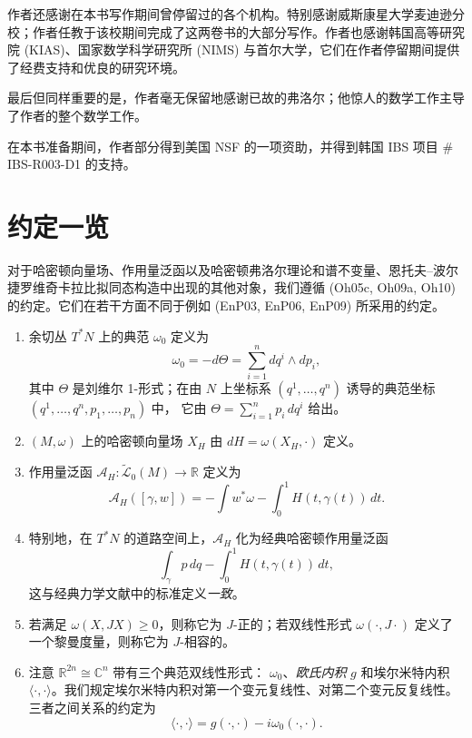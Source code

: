 作者还感谢在本书写作期间曾停留过的各个机构。特别感谢威斯康星大学麦迪逊分校；作者任教于该校期间完成了这两卷书的大部分写作。作者也感谢韩国高等研究院 (KIAS)、国家数学科学研究所 (NIMS) 与首尔大学，它们在作者停留期间提供了经费支持和优良的研究环境。

最后但同样重要的是，作者毫无保留地感谢已故的弗洛尔；他惊人的数学工作主导了作者的整个数学工作。

在本书准备期间，作者部分得到美国 NSF 的一项资助，并得到韩国 IBS 项目 \# IBS-R003-D1 的支持。

\section*{约定一览}

对于哈密顿向量场、作用量泛函以及哈密顿弗洛尔理论和谱不变量、恩托夫--波尔捷罗维奇卡拉比拟同态构造中出现的其他对象，我们遵循 (Oh05c, Oh09a, Oh10) 的约定。它们在若干方面不同于例如 (EnP03, EnP06, EnP09) 所采用的约定。

\begin{enumerate}[label=(\arabic*)]
  \item 余切丛 $T^*N$ 上的典范\termSymplecticForm{} $\omega_0$ 定义为
  \[
    \omega_0=-d\Theta=\sum_{i=1}^n dq^i\wedge dp_i,
  \]
  其中 $\Theta$ 是刘维尔 1-形式；在由 $N$ 上坐标系
  $(q^1,\ldots,q^n)$ 诱导的典范坐标
  $(q^1,\ldots,q^n,\allowbreak p_1,\ldots,p_n)$ 中，
  它由 $\Theta=\sum_{i=1}^n p_i\,dq^i$ 给出。

  \item \termSymplecticManifold{} $(M,\omega)$ 上的哈密顿向量场 $X_H$ 由 $dH=\omega(X_H,\cdot)$ 定义。

  \item 作用量泛函 $\mathcal A_H:\widetilde{\mathcal L}_0(M)\to\mathbb R$ 定义为
  \[
    \mathcal A_H([\gamma,w])=-\int w^*\omega-\int_0^1 H(t,\gamma(t))\,dt.
  \]

  \item 特别地，在 $T^*N$ 的道路空间上，$\mathcal A_H$ 化为经典哈密顿作用量泛函
  \[
    \int_\gamma p\,dq-\int_0^1 H(t,\gamma(t))\,dt,
  \]
  这与经典力学文献中的标准定义\emph{一致}。

  \item 若\termAlmostComplexStructure{}满足 $\omega(X,JX)\geq 0$，则称它为 $J$-正的；若双线性形式 $\omega(\cdot,J\cdot)$ 定义了一个黎曼度量，则称它为 $J$-相容的。

  \item 注意 $\mathbb R^{2n}\cong\mathbb C^n$ 带有三个典范双线性形式：\termSymplecticForm{} $\omega_0$、\emph{欧氏内积} $g$ 和埃尔米特内积 $\langle\cdot,\cdot\rangle$。我们规定埃尔米特内积对第一个变元复线性、对第二个变元反复线性。三者之间关系的约定为
  \[
    \langle\cdot,\cdot\rangle=g(\cdot,\cdot)-i\omega_0(\cdot,\cdot).
  \]
\end{enumerate}

